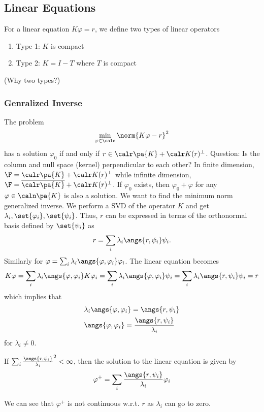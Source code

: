 
\subsection{Linear Equations}
For a linear equation $K\varphi=r$, we define two types of linear operators
\begin{enumerate}
    \item Type 1: $K$ is compact
    \item Type 2: $K=I-T$ where $T$ is compact
\end{enumerate}
{\color{red} (Why two types?)}
\subsubsection{Genralized Inverse}
The problem \begin{equation*}
    \min_{\varphi\in\cale}{\norm{K\varphi-r}^2}
\end{equation*} has a solution $\varphi_0$ if and only if $r\in \calr\pa{K}+\calr K(r)^{\perp}$.
Question: Is the column and null space (kernel) perpendicular to each other?
In finite dimension, $\F=\calr\pa{K}+\calr K(r)^{\perp}$ while infinite dimension, $\F=\overline{\calr\pa{K}}+\calr K(r)^{\perp}$.
If $\varphi_0$ exists, then $\varphi_0+\varphi$ for any $\varphi \in \caln\pa{K}$ is also a solution. We want to find the minimum norm generalized inverse.
We perform a SVD of the operator $K$ and get
$\lambda_i,\set{\varphi_i},\set{\psi_i}$. Thus, $r$ can be expressed in terms
of the orthonormal basis defined by $\set{\psi_i}$ as $$r=\sum_i
    \lambda_i\angs{r,\psi_i}\psi_i.$$ Similarly for $\varphi=\sum_i
    \lambda_i\angs{\varphi,\varphi_i}\varphi_i$. The linear equation becomes \begin{equation*}
    K\varphi=\sum_i \lambda_i\angs{\varphi,\varphi_i}K\varphi_i=\sum_i \lambda_i\angs{\varphi,\varphi_i}\psi_i=\sum_i \lambda_i\angs{r,\psi_i}\psi_i=r
\end{equation*}
which implies that \begin{align*}
     & \lambda_i\angs{\varphi,\varphi_i}=\angs{r,\psi_i}           \\
     & \angs{\varphi,\varphi_i}= \frac{\angs{r,\psi_i}}{\lambda_i}
\end{align*} for $\lambda_i\neq 0$.
\begin{definition}
    If $\sum_i \frac{\angs{r,\psi_i}}{\lambda_i}^2 < \infty$, then the solution to the linear equation is given by \begin{equation*}
        \varphi^+=\sum_i \frac{\angs{r,\psi_i}}{\lambda_i}\varphi_i
    \end{equation*}
\end{definition}
\begin{remark}
    We can see that $\varphi^+$ is not continuous w.r.t. $r$ as $\lambda_i$ can go to zero.
\end{remark}
